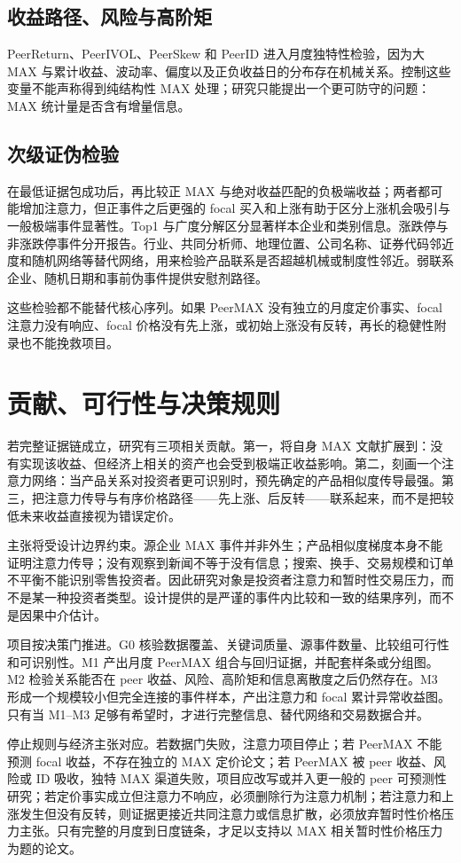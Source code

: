 \documentclass[UTF8,a4paper,11pt]{ctexart}
\begin{document}
\subsection{收益路径、风险与高阶矩}
PeerReturn、PeerIVOL、PeerSkew 和 PeerID 进入月度独特性检验，因为大 MAX 与累计收益、波动率、偏度以及正负收益日的分布存在机械关系。控制这些变量不能声称得到纯结构性 MAX 处理；研究只能提出一个更可防守的问题：MAX 统计量是否含有增量信息。

\subsection{次级证伪检验}
在最低证据包成功后，再比较正 MAX 与绝对收益匹配的负极端收益；两者都可能增加注意力，但正事件之后更强的 focal 买入和上涨有助于区分上涨机会吸引与一般极端事件显著性。Top1 与广度分解区分显著样本企业和类别信息。涨跌停与非涨跌停事件分开报告。行业、共同分析师、地理位置、公司名称、证券代码邻近度和随机网络等替代网络，用来检验产品联系是否超越机械或制度性邻近。弱联系企业、随机日期和事前伪事件提供安慰剂路径。

这些检验都不能替代核心序列。如果 PeerMAX 没有独立的月度定价事实、focal 注意力没有响应、focal 价格没有先上涨，或初始上涨没有反转，再长的稳健性附录也不能挽救项目。

\section{贡献、可行性与决策规则}
若完整证据链成立，研究有三项相关贡献。第一，将自身 MAX 文献扩展到：没有实现该收益、但经济上相关的资产也会受到极端正收益影响。第二，刻画一个注意力网络：当产品关系对投资者更可识别时，预先确定的产品相似度传导最强。第三，把注意力传导与有序价格路径——先上涨、后反转——联系起来，而不是把较低未来收益直接视为错误定价。

主张将受设计边界约束。源企业 MAX 事件并非外生；产品相似度梯度本身不能证明注意力传导；没有观察到新闻不等于没有信息；搜索、换手、交易规模和订单不平衡不能识别零售投资者。因此研究对象是投资者注意力和暂时性交易压力，而不是某一种投资者类型。设计提供的是严谨的事件内比较和一致的结果序列，而不是因果中介估计。

项目按决策门推进。G0 核验数据覆盖、关键词质量、源事件数量、比较组可行性和可识别性。M1 产出月度 PeerMAX 组合与回归证据，并配套样条或分组图。M2 检验关系能否在 peer 收益、风险、高阶矩和信息离散度之后仍然存在。M3 形成一个规模较小但完全连接的事件样本，产出注意力和 focal 累计异常收益图。只有当 M1--M3 足够有希望时，才进行完整信息、替代网络和交易数据合并。

停止规则与经济主张对应。若数据门失败，注意力项目停止；若 PeerMAX 不能预测 focal 收益，不存在独立的 MAX 定价论文；若 PeerMAX 被 peer 收益、风险或 ID 吸收，独特 MAX 渠道失败，项目应改写或并入更一般的 peer 可预测性研究；若定价事实成立但注意力不响应，必须删除行为注意力机制；若注意力和上涨发生但没有反转，则证据更接近共同注意力或信息扩散，必须放弃暂时性价格压力主张。只有完整的月度到日度链条，才足以支持以 MAX 相关暂时性价格压力为题的论文。
\end{document}
